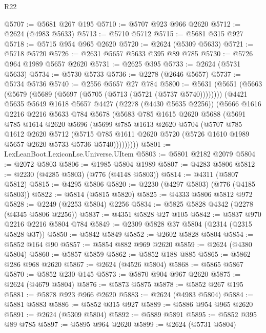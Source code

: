 \begin{lexlean}{R22}
\begin{coremodule}
@5707 := @5681 @267 @195
@5710 := @5707 @923 @966 @2620
@5712 := @2624 (@4983 @5633)
@5713 := @5710 @5712
@5715 := @5681 @315 @927
@5718 := @5715 @954 @965 @2620
@5720 := @2624 (@5309 @5633)
@5721 := @5718 @5720
@5726 := @2631 @5657 @5633 @395 @89 @785
@5730 := @5726 @964 @1989 @5657 @2620
@5731 := @2625 @395
@5733 := @2624 (@5731 @5633)
@5734 := @5730 @5733
@5736 := @2278 (@2646 @5657)
@5737 := @5734 @5736
@5740 := @2556 @5657 @27 @784
@5800 := @5631
    (@5651
      (@5663 (@5679 (@5689 (@5697 (@5705 (@5713 (@5721 (@5737 @5740))))))))
      (@4421
        @5635
        @5649
        @1618
        @5657
        @4427
        (@2278 (@4430 @5635 @2256))
        (@5666
          @1616
          @2216
          @2216
          @5633
          @784
          @5678
          (@5683
            @785
            @1615
            @2620
            @5688
            (@5691
              @785
              @1614
              @2620
              @5696
              (@5699
                @785
                @1613
                @2620
                @5704
                (@5707
                  @785
                  @1612
                  @2620
                  @5712
                  (@5715
                    @785
                    @1611
                    @2620
                    @5720
                    (@5726 @1610 @1989 @5657 @2620 @5733 @5736 @5740)))))))))
@5801 := LexLeanBoot.LexiconLse.Universe.UItem
@5803 := @5801 @2182 @2079
@5804 := @2072 @5803
@5806 := @1985 @5804 @1989
@5807 := @4283 @5806
@5812 := @2230 (@4285 @5803) (@776 (@4148 @5803))
@5814 := @4311 (@5807 @5812)
@5815 := @4295 @5806
@5820 := @2230 (@4297 @5803) (@776 (@4185 @5803))
@5822 := @5814 (@5815 @5820)
@5825 := @4333 @5806 @5812 @972
@5828 := @2249 (@2253 @5804) @2256
@5834 := @5825 @5828 @4342 (@2278 (@4345 @5806 @2256))
@5837 := @4351 @5828 @27 @105
@5842 := @5837 @970 @2216 @2216 @5804 @784
@5849 := @2309 @5828 @37 @5804 (@2314 (@2315 @5828 @37))
@5850 := @5842 @5849
@5852 := @2602 @5828 @5804
@5854 := @5852 @164 @90
@5857 := @5854 @882 @969 @2620
@5859 := @2624 (@4380 @5804)
@5860 := @5857 @5859
@5862 := @5852 @188 @885
@5865 := @5862 @286 @968 @2620
@5867 := @2624 (@4526 @5804)
@5868 := @5865 @5867
@5870 := @5852 @230 @145
@5873 := @5870 @904 @967 @2620
@5875 := @2624 (@4679 @5804)
@5876 := @5873 @5875
@5878 := @5852 @267 @195
@5881 := @5878 @923 @966 @2620
@5883 := @2624 (@4983 @5804)
@5884 := @5881 @5883
@5886 := @5852 @315 @927
@5889 := @5886 @954 @965 @2620
@5891 := @2624 (@5309 @5804)
@5892 := @5889 @5891
@5895 := @5852 @395 @89 @785
@5897 := @5895 @964 @2620
@5899 := @2624 (@5731 @5804)

\end{coremodule}
\end{lexlean}

